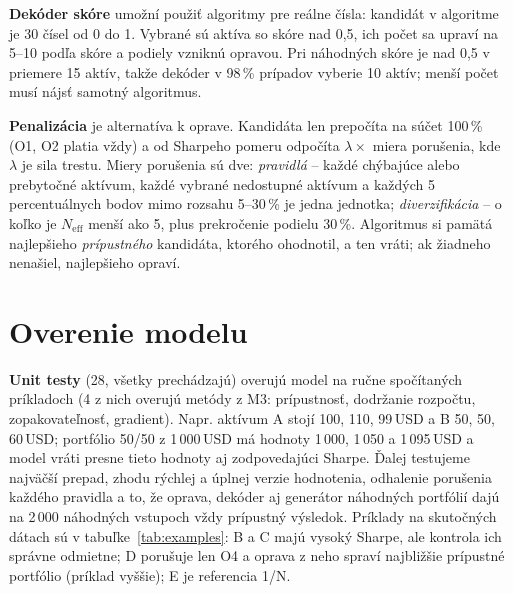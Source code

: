 \documentclass[10pt,a4paper]{article}
\begin{document}
\textbf{Dekóder skóre} umožní použiť algoritmy pre reálne čísla: kandidát v algoritme je 30 čísel od 0 do 1.
Vybrané sú aktíva so skóre nad 0,5, ich počet sa upraví na 5--10 podľa skóre a podiely vzniknú opravou.
Pri náhodných skóre je nad 0,5 v priemere 15 aktív, takže dekóder v 98\,\% prípadov vyberie 10 aktív;
menší počet musí nájsť samotný algoritmus.

\textbf{Penalizácia} je alternatíva k oprave. Kandidáta len prepočíta na súčet 100\,\% (O1, O2 platia vždy)
a od Sharpeho pomeru odpočíta $\lambda\times$ miera porušenia, kde $\lambda$ je sila trestu. Miery porušenia sú dve:
\emph{pravidlá} -- každé chýbajúce alebo prebytočné aktívum, každé vybrané nedostupné aktívum a každých
5 percentuálnych bodov mimo rozsahu 5--30\,\% je jedna jednotka; \emph{diverzifikácia} -- o koľko je
$N_\text{eff}$ menší ako 5, plus prekročenie podielu 30\,\%. Algoritmus si pamätá najlepšieho
\emph{prípustného} kandidáta, ktorého ohodnotil, a ten vráti; ak žiadneho nenašiel, najlepšieho opraví.

\section{Overenie modelu}

\textbf{Unit testy} (28, všetky prechádzajú) overujú model na ručne spočítaných príkladoch
(4 z nich overujú metódy z M3: prípustnosť, dodržanie rozpočtu, zopakovateľnosť, gradient).
Napr. aktívum A stojí 100, 110, 99\,USD a B 50, 50, 60\,USD; portfólio 50/50 z 1\,000\,USD
má hodnoty 1\,000, 1\,050 a 1\,095\,USD a model vráti presne tieto hodnoty aj zodpovedajúci Sharpe.
Ďalej testujeme najväčší prepad, zhodu rýchlej a úplnej verzie hodnotenia, odhalenie porušenia
každého pravidla a to, že oprava, dekóder aj generátor náhodných portfólií dajú na 2\,000
náhodných vstupoch vždy prípustný výsledok. Príklady na skutočných dátach sú v tabuľke~\ref{tab:examples}:
B a C majú vysoký Sharpe, ale kontrola ich správne odmietne; D porušuje len O4 a oprava z neho
spraví najbližšie prípustné portfólio (príklad vyššie); E je referencia 1/N.
\end{document}
